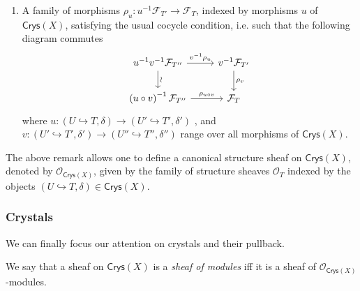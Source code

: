 \begin{rem}
\begin{enumerate}
		\item A family of morphisms $\rho_u\colon u^{-1}\mathcal{F}_{T'} \to \mathcal{F}_T$,
			indexed by morphisms 
			$u$ of $\mathsf{Crys}(X)$,
			satisfying the usual cocycle condition, i.e.
			such that the following diagram commutes
			\begin{equation*}
			\begin{tikzcd}
				u^{-1} v^{-1} \mathcal{F}_{T''} 
				\arrow[r, "v^{-1}\rho_u", rightarrow] 
				\arrow[d, "\rotatebox{90}{\(\sim\)}", rightarrow] &
				v^{-1} \mathcal{F}_{T'} 
				\arrow[d, "\rho_v", rightarrow] \\
				\left( u \circ v \right)^{-1} \mathcal{F}_{T''}
				\arrow[r, "\rho_{u \circ v}", rightarrow] &
				\mathcal{F}_T
			\end{tikzcd}
			\end{equation*}
			where $u\colon \left(U \hookrightarrow T, \delta\right) \to 
			\left(U' \hookrightarrow T', \delta'\right)$ ,
			and $v\colon \left(U' \hookrightarrow T', \delta'\right) \to 
			\left(U'' \hookrightarrow T'', \delta''\right)$
			range over all morphisms of $\mathsf{Crys}(X)$.
	\end{enumerate}
\end{rem}


\begin{ex}
	The above remark allows one to define a canonical structure sheaf
	on $\mathsf{Crys}(X)$, denoted by $\mathcal{O}_{\mathsf{Crys}(X)}$,
	given by the family of structure sheaves $\mathcal{O}_T$
	indexed by the objects 
	$\left(U \hookrightarrow T, \delta\right) \in \mathsf{Crys}(X)$.
\end{ex}



\subsubsection{Crystals}
We can finally focus our attention on crystals and their pullback.


\begin{defn}
	We say that a sheaf on $\mathsf{Crys}(X)$ is a \emph{sheaf of modules}
	iff it is a sheaf of $\mathcal{O}_{\mathsf{Crys}(X)}$-modules.
\end{defn}


